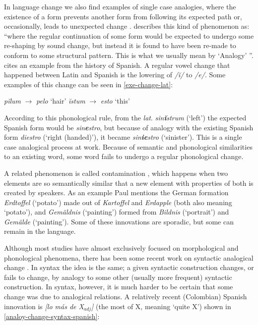 In language change we also find examples of single case analogies, where the existence of a form prevents another form from following its expected path or, occasionally, leads to unexpected change \autocite{Bauer.2003}. \textcite[p. 276]{Anderson.2015} describes this kind of phenomenon as: ``where the regular continuation of some form would be expected to undergo some re-shaping by sound change, but instead it is found to have been re-made to conform to some structural pattern. This is what we usually mean by `Analogy' ''. \textcite{Rainer.2013} cites an example from the history of Spanish. A regular vowel change that happened between Latin and Spanish is the lowering of \textit{/ĭ/} to \textit{/e/}. Some examples of this change can be seen in \ref{exe-change-lat}:


\begin{exe}
    \ex \label{exe-change-lat}
    \begin{xlist}
        \ex \textit{pĭlum} $\rightarrow$ \textit{pelo} `hair'
        \ex \textit{ĭstum} $\rightarrow$ \textit{esto} `this'
    \end{xlist}
\end{exe}

According to this phonological rule, from the \textit{lat}. \textit{sin\textbf{ĭ}strum} (`left') the expected Spanish form would be \textit{sin\textbf{e}stro}, but because of analogy with the existing Spanish form \textit{diestro} (`right (handed)'), it became \textit{sin\textbf{ie}stro} (`sinister'). This is a single case analogical process at work. Because of semantic and phonological similarities to an existing word, some word fails to undergo a regular phonological change.

A  related phenomenon is called contamination \autocite[p. 160]{Paul.1880}, which happens when two elements are so semantically similar that a new element with properties of both is created by speakers. As an example Paul mentions the German formation \textit{Erdtoffel} (`potato') made out of \textit{Kartoffel} and \textit{Erdapple} (both also meaning `potato'), and \textit{Gemäldnis} (`painting') formed from \textit{Bildnis} (`portrait') and \textit{Gemälde} (`painting'). Some of these innovations are sporadic, but some can remain in the language.

Although most studies have almost exclusively focused on morphological and phonological phenomena, there has been some recent work on syntactic analogical change \autocite{DeSmet.2016}. In syntax the idea is the same; a given syntactic construction changes, or fails to change, by analogy to some other (usually more frequent) syntactic construction. In syntax, however, it is much harder to be certain that some change was due to analogical relations. A relatively recent (Colombian) Spanish innovation is \textit{[lo más de X$_{adj}$]} (the most of X, meaning `quite X') shown in \ref{analoy-change-syntax-spanish}:


